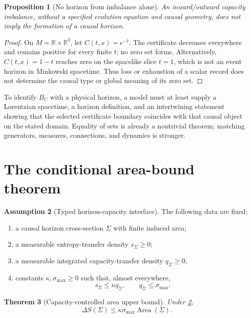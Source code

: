 \documentclass[11pt,a4paper]{article}
\numberwithin{equation}{section}
\newtheorem{theorem}{Theorem}[section]
\newtheorem{proposition}[theorem]{Proposition}
\theoremstyle{definition}
\newtheorem{assumption}[theorem]{Assumption}
\theoremstyle{remark}
\newcommand{\bbR}{\mathbb R}
\begin{document}
\begin{proposition}[No horizon from imbalance alone]
\label{prop:nohorizon}
An inward/outward capacity imbalance, without a specified evolution
equation and causal geometry, does not imply the formation of a causal
horizon.
\end{proposition}

\begin{proof}
On \(M=\bbR\times\bbR^3\), let \(C(t,x)=e^{-t}\).  The certificate
decreases everywhere and remains positive for every finite \(t\); no zero
set forms.  Alternatively, \(C(t,x)=1-t\) reaches zero on the spacelike
slice \(t=1\), which is not an event horizon in Minkowski spacetime.
Thus loss or exhaustion of a scalar record does not determine the causal
type or global meaning of its zero set.
\end{proof}

To identify \(B_C\) with a physical horizon, a model must at least supply
a Lorentzian spacetime, a horizon definition, and an intertwining
statement showing that the selected certificate boundary coincides with
that causal object on the stated domain.  Equality of sets is already a
nontrivial theorem; matching generators, measures, connections, and
dynamics is stronger.

\section{The conditional area-bound theorem}
\label{sec:bound}

\begin{assumption}[Typed horizon-capacity interface]
\label{ass:interface}
The following data are fixed:
\begin{enumerate}[leftmargin=2em]
\item a causal horizon cross-section \(\Sigma\) with finite induced area;
\item a measurable entropy-transfer density \(s_\Sigma\geq0\);
\item a measurable integrated capacity-transfer density \(q_\Sigma\geq0\);
\item constants \(\kappa,\sigma_{\max}\geq0\) such that, almost everywhere,
  \[
    s_\Sigma\leq\kappa q_\Sigma,
    \qquad
    q_\Sigma\leq\sigma_{\max}.
  \]
\end{enumerate}
\end{assumption}

\begin{theorem}[Capacity-controlled area upper bound]
\label{thm:area}
Under \cref{ass:interface},
\[
  \Delta S(\Sigma)
  \leq
  \kappa\sigma_{\max}\operatorname{Area}(\Sigma).
\]
\end{theorem}
\end{document}
